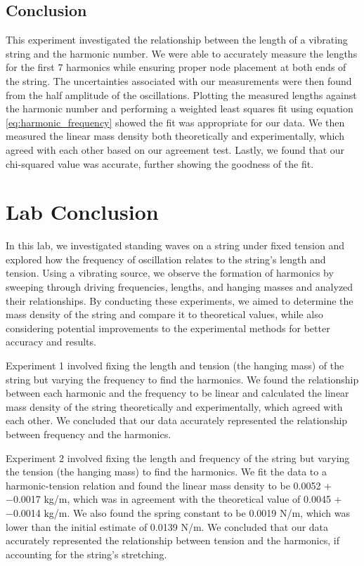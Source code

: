 \documentclass[11pt]{article}
\let\oldsection\section
\renewcommand\section{\clearpage\oldsection}
\begin{document}
    
    \subsection{Conclusion}\label{subsec:part_3_conclusion}
    This experiment investigated the relationship between the length of a vibrating string and the harmonic number.
    We were able to accurately measure the lengths for the first 7 harmonics while ensuring proper node placement at both ends of the string.
    The uncertainties associated with our measurements were then found from the half amplitude of the oscillations.
    Plotting the measured lengths against the harmonic number and performing a weighted least squares fit using equation \ref{eq:harmonic_frequency} showed the fit was appropriate for our data.
    We then measured the linear mass density both theoretically and experimentally, which agreed with each other based on our agreement test.
    Lastly, we found that our chi-squared value was accurate, further showing the goodness of the fit.

    \section{Lab Conclusion}\label{sec:lab_conclusion}
    In this lab, we investigated standing waves on a string under fixed tension and explored how the frequency of oscillation relates to the string's length and tension. Using a vibrating source, we observe the formation of harmonics by sweeping through driving frequencies, lengths, and hanging masses and analyzed their relationships. By conducting these experiments, we aimed to determine the mass density of the string and compare it to theoretical values, while also considering potential improvements to the experimental methods for better accuracy and results.
    
    Experiment 1 involved fixing the length and tension (the hanging mass) of the string but varying the frequency to find the harmonics. We found the relationship between each harmonic and the frequency to be linear and calculated the linear mass density of the string theoretically and experimentally, which agreed with each other. We concluded that our data accurately represented the relationship between frequency and the harmonics.

    Experiment 2 involved fixing the length and frequency of the string but varying the tension (the hanging mass) to find the harmonics.
    We fit the data to a harmonic-tension relation and found the linear mass density to be 0.0052 + −0.0017 kg/m, which was in agreement with the theoretical value of 0.0045 + −0.0014 kg/m.
    We also found the spring constant to be 0.0019 N/m, which was lower than the initial estimate of 0.0139 N/m.
    We concluded that our data accurately represented the relationship between tension and the harmonics, if accounting for the string's stretching.
\end{document}
